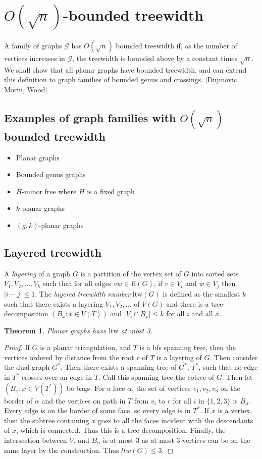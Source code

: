 \documentclass[]{article}
\newcommand{\ltw}{\text{ltw}}
\newtheorem{theorem}{Theorem}
\theoremstyle{definition}
\numberwithin{theorem}{section}
\numberwithin{equation}{section}
\begin{document}
\section{$O(\sqrt{n})$-bounded treewidth}
A family of graphs $\mathcal{G}$ has $O(\sqrt{n})$ bounded treewidth if, as the number of vertices increases in $\mathcal{G}$, the treewidth is bounded above by a constant times $\sqrt{n}$. We shall show that all planar graphs have bounded treewidth, and can extend this definition to graph families of bounded genus and crossings. [Dujmovic, Morin, Wood] 

\subsection{Examples of graph families with $O(\sqrt{n})$ bounded treewidth}

\begin{itemize}
	\item Planar graphs
	\item Bounded genus graphs
	\item $H$-minor free where $H$ is a fixed graph
	\item $k$-planar graphs
	\item $(g, k)$-planar graphs
\end{itemize}

\subsection{Layered treewidth}
A \textit{layering} of a graph $G$ is a partition of the vertex set of $G$ into sorted sets $V_1, V_2, ..., V_k$ such that for all edges $vw \in E(G)$, if $v \in V_i$ and $w \in V_j$ then $|i - j| \leq 1$. The \textit{layered treewidth number} $\ltw(G)$ is defined as the smallest $k$ such that there exists a layering $V_1, V_2, ...$ of $V(G)$ and there is a tree-decomposition $(B_x: x \in V(T))$ and $|V_i \cap B_x| \leq k$ for all $i$ and all $x$. 
\begin{theorem}
	Planar graphs have $\ltw$ at most 3. 
\end{theorem}
\begin{proof}
	If $G$ is a planar triangulation, and $T$ is a bfs spanning tree, then the vertices ordered by distance from the root $r$ of $T$ is a layering of $G$. Then consider the dual graph $G^*$. Then there exists a spanning tree of $G^*$, $T^*$, such that no edge in $T^*$ crosses over an edge in $T$. Call this spanning tree the cotree of $G$. Then let $\left( B_x: x \in V(T^*) \right)$ be bags. For a face $\alpha$, the set of vertices $v_1, v_2, v_3$ on the border of $\alpha$ and the vertices on path in $T$ from $v_i$ to $r$ for all $i$ in $\lbrace 1, 2, 3 \rbrace$ is $B_\alpha$. Every edge is on the border of some face, so every edge is in $T^*$. If $x$ is a vertex, then the subtree containing $x$ goes to all the faces incident with the descendants of $x$, which is connected. Thus this is a tree-decomposition. Finally, the intersection between $V_i$ and $B_\alpha$ is at most 3 as at most 3 vertices can be on the same layer by the construction. Thus $ltw(G) \leq 3$. 
\end{proof}
\end{document}

